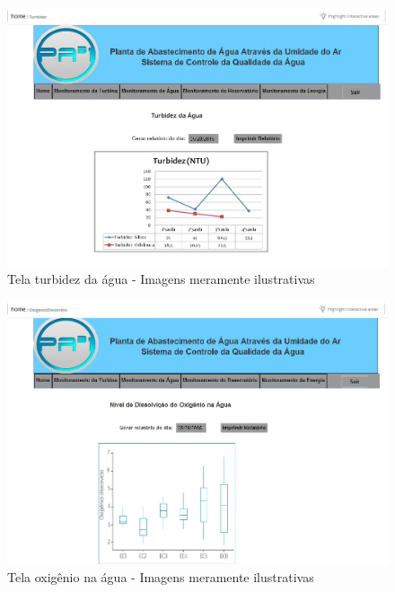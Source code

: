 \begin{center}
\begin{figure}[!ht]
\centering
\includegraphics[scale=0.5]{figuras/6}
\caption[Tela turbidez da água]{Tela turbidez da água - Imagens meramente ilustrativas}
\label{tela_turbidez_da_agua}
\end{figure}
\clearpage

\begin{figure}[!ht]
\centering
\includegraphics[scale=0.5]{figuras/7}
\caption[Tela oxigênio na água]{Tela oxigênio na água - Imagens meramente ilustrativas}
\label{tela_oxigenio_na_agua}
\end{figure}
\clearpage


\end{center}
